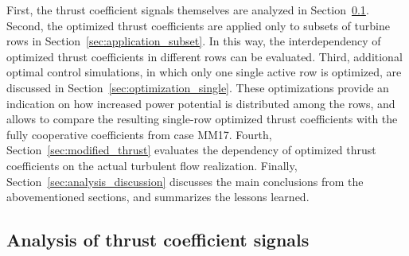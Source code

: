 \documentclass[wes, manuscript]{copernicus}
\begin{document}
First, the thrust coefficient signals themselves are analyzed in Section~\ref{sec:analysis_thrust}. Second, the optimized thrust coefficients are applied only to subsets of turbine rows in Section~\ref{sec:application_subset}. In this way, the interdependency of optimized thrust coefficients in different rows can be evaluated. Third, additional optimal control simulations, in which only one single active row is optimized, are discussed in Section~\ref{sec:optimization_single}. These optimizations provide an indication on how increased power potential is distributed among the rows, and allows to compare the resulting single-row optimized thrust coefficients with the fully cooperative coefficients from case MM17. Fourth, Section~\ref{sec:modified_thrust} evaluates the dependency of optimized thrust coefficients on the actual turbulent flow realization. Finally, Section~\ref{sec:analysis_discussion} discusses the main conclusions from the abovementioned sections, and summarizes the lessons learned.

\subsection{Analysis of thrust coefficient signals}\label{sec:analysis_thrust}
\end{document}

